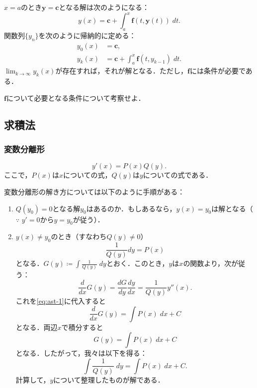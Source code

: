 $x=a$のとき$\bm{y}=\bm{c}$となる解は次のようになる：
\[ y(x) = \bm{c} + \int_{a}^{x} \bm{f}(t,\bm{y}(t)) \; dt.\]
関数列$\{y_n\}$を次のように帰納的に定める：
\begin{align*}
    y_0(x) &= \bm{c}, \\
    y_k(x) &= \bm{c} + \int_{a}^{x} \bm{f}(t,y_{k-1}) \; dt.
\end{align*}
$\lim_{k \to \infty} y_k(x)$が存在すれば，それが解となる．ただし，$\bm{f}$には条件が必要である．
\begin{homework*}
    $\bm{f}$について必要となる条件について考察せよ．
\end{homework*}

\subsection{求積法}
\subsubsection{変数分離形}
\begin{equation}
    y'(x) = P(x) Q(y).  \label{eq:ast-0}
\end{equation}
ここで，$P(x)$は$x$についての式，$Q(y)$は$y$についての式である．

変数分離形の解き方については以下のように手順がある：
\begin{enumerate}[label=(\arabic*)]
    \item $Q(y_0)=0$となる解$y_0$はあるのか．もしあるなら，$y(x)=y_0$は解となる（$\because$ $y'=0$から$y=y_0$が従う）．
    \item $y(x) \neq y_0$のとき（すなわち$Q(y) \neq 0$）
    \begin{equation}
        \frac{1}{Q(y)} dy = P(x) \label{eq:ast-1}
    \end{equation}
    となる．$G(y) \coloneqq \int \frac{1}{Q(y)} \; dy$とおく．このとき，$y$は$x$の関数より，次が従う：
    \[ \frac{d}{dx} G(y) = \frac{dG}{dy} \frac{dy}{dx} = \frac{1}{Q(y)} y''(x).\]
    これを\eqref{eq:ast-1}に代入すると
    \[ \frac{d}{dx} G(y) = \int P(x) \; dx + C\]
    となる．両辺$x$で積分すると
    \[ G(y) = \int P(x) \; dx + C\]
    となる．したがって，我々は以下を得る：
    \[ \int \frac{1}{Q(y)} \; dy = \int P(x) \; dx + C.\]
    計算して，$y$について整理したものが解である．
\end{enumerate}

